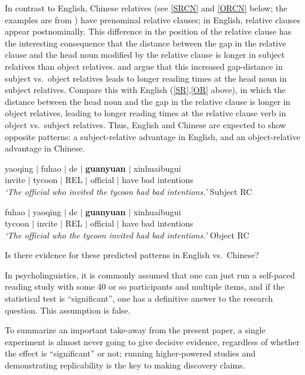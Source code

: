 \documentclass{ar-1col}\usepackage[]{graphicx}\usepackage[]{color}
\begin{document}
In contrast to English, 
Chinese relatives (see \ref{SRCN} and \ref{ORCN} below; the examples are from \citet{gibsonwu}) have prenominal relative clauses; in English, relative clauses appear postnominally. This difference in the position of the relative clause has the interesting consequence that the distance between the gap in the relative clause and the head noun modified by the relative clause is longer in subject relatives than object relatives. \citet{hsiao03} and \citet{gibsonwu} argue that this increased gap-distance in subject vs.\ object relatives leads to longer reading times at the head noun in subject relatives. Compare this with English (\ref{SR},\ref{OR} above), in which the distance between the head noun and the gap in the relative clause is longer in object relatives, leading to longer reading times at the relative clause verb in object vs.\ subject relatives. Thus, English and Chinese are expected to show opposite patterns: a subject-relative advantage in English, and an object-relative advantage in Chinese.

\begin{exe} 
\ex   \label{chineseexample}
\begin{xlist}
\item \label{SRCN}  
\gll  yaoqing $\mid$ fuhao $\mid$ de $\mid$ \textbf{guanyuan} $\mid$ xinhuaibugui\\
invite $\mid$ tycoon $\mid$ REL $\mid$ official $\mid$ have bad intentions\\
\textit{`The official who invited the tycoon had bad intentions.'} Subject RC 
\item \label{ORCN}  
\gll  fuhao $\mid$ yaoqing   $\mid$ de $\mid$ \textbf{guanyuan} $\mid$ xinhuaibugui\\
tycoon $\mid$  invite $\mid$ REL $\mid$ official $\mid$ have bad intentions\\
\textit{`The official who the tycoon invited had bad intentions.'} Object RC
\end{xlist}
\end{exe}

Is there evidence for these predicted patterns in English vs.\ Chinese? 

In psycholinguistics, it is commonly assumed that one can just run a self-paced reading study with some 40 or so participants and multiple items, and if the statistical test is ``significant'', one has a definitive answer to the research question. This assumption is false. 

To summarize an important take-away from the present paper, a single experiment is almost never going to give decisive evidence, regardless of whether the effect is ``significant'' or not; running higher-powered studies and demonstrating replicability is the key to making discovery claims. 
\end{document}
